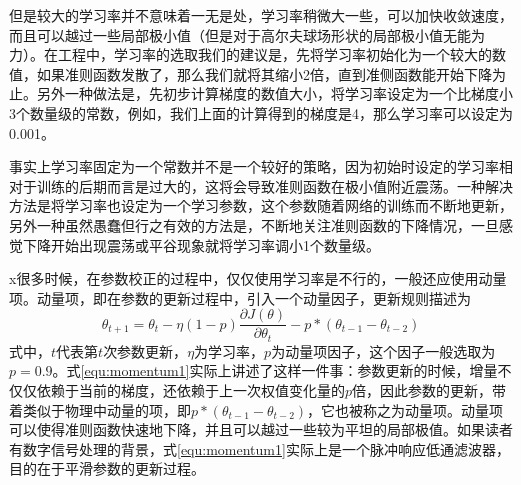 但是较大的学习率并不意味着一无是处，学习率稍微大一些，可以加快收敛速度，而且可以越过一些局部极小值（但是对于高尔夫球场形状的局部极小值无能为力）。在工程中，学习率的选取我们的建议是，先将学习率初始化为一个较大的数值，如果准则函数发散了，那么我们就将其缩小2倍，直到准侧函数能开始下降为止。另外一种做法是，先初步计算梯度的数值大小，将学习率设定为一个比梯度小3个数量级的常数，例如，我们上面的计算得到的梯度是4，那么学习率可以设定为0.001。

事实上学习率固定为一个常数并不是一个较好的策略，因为初始时设定的学习率相对于训练的后期而言是过大的，这将会导致准则函数在极小值附近震荡。一种解决方法是将学习率也设定为一个学习参数，这个参数随着网络的训练而不断地更新，另外一种虽然愚蠢但行之有效的方法是，不断地关注准则函数的下降情况，一旦感觉下降开始出现震荡或平谷现象就将学习率调小1个数量级。

x很多时候，在参数校正的过程中，仅仅使用学习率是不行的，一般还应使用动量项。动量项，即在参数的更新过程中，引入一个动量因子，更新规则描述为
\begin{equation}
\theta_{t+1} = \theta_t - \eta(1-p)\frac{\partial J(\theta)}{ \partial \theta_t} - p * (\theta_{t-1} - \theta_{t-2})
\label{equ:momentum1}
\end{equation}
式中，$t$代表第$t$次参数更新，$\eta$为学习率，$p$为动量项因子，这个因子一般选取为$p = 0.9$。式\eqref{equ:momentum1}实际上讲述了这样一件事：参数更新的时候，增量不仅仅依赖于当前的梯度，还依赖于上一次权值变化量的$p$倍，因此参数的更新，带着类似于物理中动量的项，即$p * (\theta_{t-1} - \theta_{t-2})$，它也被称之为动量项。动量项可以使得准则函数快速地下降，并且可以越过一些较为平坦的局部极值。如果读者有数字信号处理的背景，式\eqref{equ:momentum1}实际上是一个脉冲响应低通滤波器，目的在于平滑参数的更新过程。


